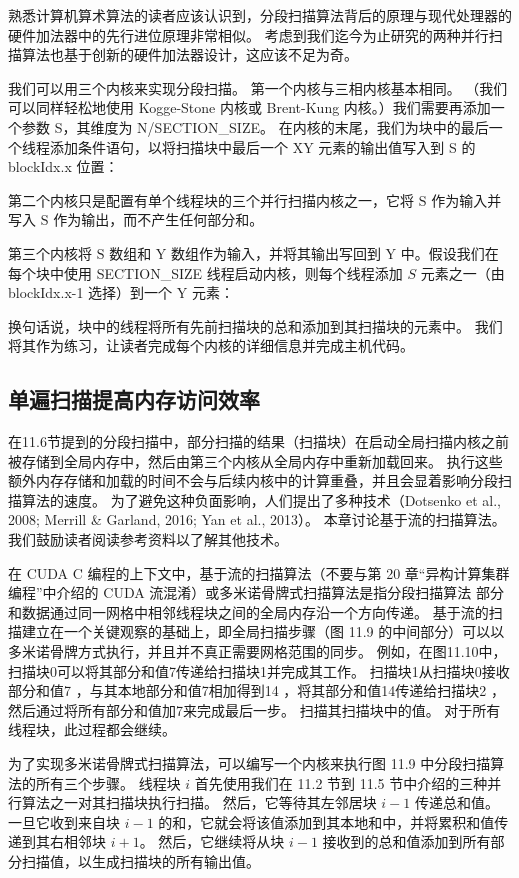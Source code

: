 熟悉计算机算术算法的读者应该认识到，分段扫描算法背后的原理与现代处理器的硬件加法器中的先行进位原理非常相似。 考虑到我们迄今为止研究的两种并行扫描算法也基于创新的硬件加法器设计，这应该不足为奇。

我们可以用三个内核来实现分段扫描。 第一个内核与三相内核基本相同。 （我们可以同样轻松地使用 Kogge-Stone 内核或 Brent-Kung 内核。）我们需要再添加一个参数 S，其维度为 N/SECTION\_SIZE。 在内核的末尾，我们为块中的最后一个线程添加条件语句，以将扫描块中最后一个 $\mathrm{XY}$ 元素的输出值写入到 S 的 blockIdx.x 位置：

第二个内核只是配置有单个线程块的三个并行扫描内核之一，它将 $\mathrm{S}$ 作为输入并写入 $\mathrm{S}$ 作为输出，而不产生任何部分和。

第三个内核将 $\mathrm{S}$ 数组和 $\mathrm{Y}$ 数组作为输入，并将其输出写回到 Y 中。假设我们在每个块中使用 SECTION\_SIZE 线程启动内核，则每个线程添加 $S$ 元素之一（由 blockIdx.x-1 选择）到一个 $\mathrm{Y}$ 元素：

换句话说，块中的线程将所有先前扫描块的总和添加到其扫描块的元素中。 我们将其作为练习，让读者完成每个内核的详细信息并完成主机代码。

\subsection{单遍扫描提高内存访问效率}
在11.6节提到的分段扫描中，部分扫描的结果（扫描块）在启动全局扫描内核之前被存储到全局内存中，然后由第三个内核从全局内存中重新加载回来。 执行这些额外内存存储和加载的时间不会与后续内核中的计算重叠，并且会显着影响分段扫描算法的速度。 为了避免这种负面影响，人们提出了多种技术（Dotsenko et al., 2008; Merrill \& Garland, 2016; Yan et al., 2013）。 本章讨论基于流的扫描算法。 我们鼓励读者阅读参考资料以了解其他技术。

在 CUDA C 编程的上下文中，基于流的扫描算法（不要与第 20 章“异构计算集群编程”中介绍的 CUDA 流混淆）或多米诺骨牌式扫描算法是指分段扫描算法 部分和数据通过同一网格中相邻线程块之间的全局内存沿一个方向传递。 基于流的扫描建立在一个关键观察的基础上，即全局扫描步骤（图 11.9 的中间部分）可以以多米诺骨牌方式执行，并且并不真正需要网格范围的同步。 例如，在图11.10中，扫描块0可以将其部分和值7传递给扫描块1并完成其工作。 扫描块1从扫描块0接收部分和值7 ，与其本地部分和值7相加得到14 ，将其部分和值14传递给扫描块2 ，然后通过将所有部分和值加7来完成最后一步。 扫描其扫描块中的值。 对于所有线程块，此过程都会继续。

为了实现多米诺骨牌式扫描算法，可以编写一个内核来执行图 11.9 中分段扫描算法的所有三个步骤。 线程块 $i$ 首先使用我们在 11.2 节到 11.5 节中介绍的三种并行算法之一对其扫描块执行扫描。 然后，它等待其左邻居块 $i-1$ 传递总和值。 一旦它收到来自块 $i-1$ 的和，它就会将该值添加到其本地和中，并将累积和值传递到其右相邻块 $i+1$。 然后，它继续将从块 $i-1$ 接收到的总和值添加到所有部分扫描值，以生成扫描块的所有输出值。

